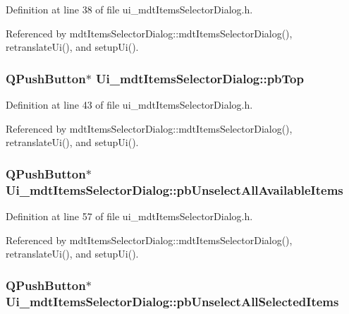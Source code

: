 Definition at line 38 of file ui\-\_\-mdt\-Items\-Selector\-Dialog.\-h.



Referenced by mdt\-Items\-Selector\-Dialog\-::mdt\-Items\-Selector\-Dialog(), retranslate\-Ui(), and setup\-Ui().

\hypertarget{class_ui__mdt_items_selector_dialog_a9c2ee685c32d86d376ec9ddf22e88daf}{
\subsubsection[{pb\-Top}]{\setlength{\rightskip}{0pt plus 5cm}Q\-Push\-Button$\ast$ Ui\-\_\-mdt\-Items\-Selector\-Dialog\-::pb\-Top}}\label{class_ui__mdt_items_selector_dialog_a9c2ee685c32d86d376ec9ddf22e88daf}


Definition at line 43 of file ui\-\_\-mdt\-Items\-Selector\-Dialog.\-h.



Referenced by mdt\-Items\-Selector\-Dialog\-::mdt\-Items\-Selector\-Dialog(), retranslate\-Ui(), and setup\-Ui().

\hypertarget{class_ui__mdt_items_selector_dialog_a60522f80b3aaf215fd4003465676dfdd}{
\subsubsection[{pb\-Unselect\-All\-Available\-Items}]{\setlength{\rightskip}{0pt plus 5cm}Q\-Push\-Button$\ast$ Ui\-\_\-mdt\-Items\-Selector\-Dialog\-::pb\-Unselect\-All\-Available\-Items}}\label{class_ui__mdt_items_selector_dialog_a60522f80b3aaf215fd4003465676dfdd}


Definition at line 57 of file ui\-\_\-mdt\-Items\-Selector\-Dialog.\-h.



Referenced by mdt\-Items\-Selector\-Dialog\-::mdt\-Items\-Selector\-Dialog(), retranslate\-Ui(), and setup\-Ui().

\hypertarget{class_ui__mdt_items_selector_dialog_abc7b9edc742879adc682649d76ea7395}{
\subsubsection[{pb\-Unselect\-All\-Selected\-Items}]{\setlength{\rightskip}{0pt plus 5cm}Q\-Push\-Button$\ast$ Ui\-\_\-mdt\-Items\-Selector\-Dialog\-::pb\-Unselect\-All\-Selected\-Items}}\label{class_ui__mdt_items_selector_dialog_abc7b9edc742879adc682649d76ea7395}


